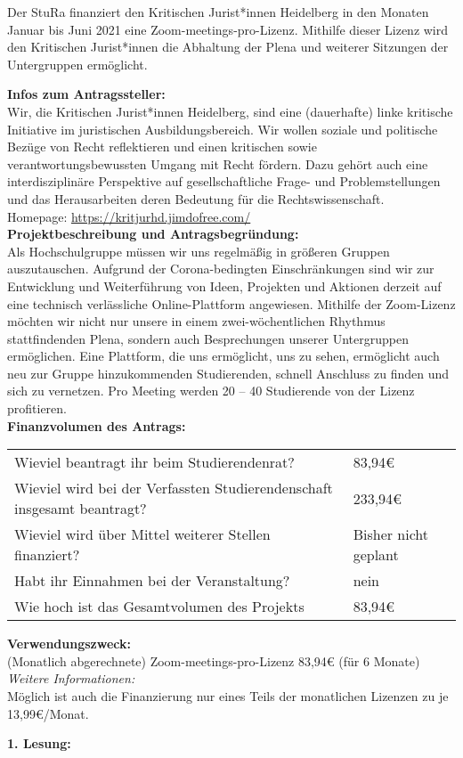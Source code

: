 {
    Der StuRa finanziert den Kritischen Jurist*innen Heidelberg in den Monaten Januar bis Juni 2021 eine Zoom-meetings-pro-Lizenz. Mithilfe dieser Lizenz wird den Kritischen Jurist*innen die Abhaltung der Plena und weiterer Sitzungen der Untergruppen ermöglicht.
}{
    \textbf{Infos zum Antragssteller:}\\
    Wir, die Kritischen Jurist*innen Heidelberg, sind eine (dauerhafte) linke kritische Initiative im juristischen Ausbildungsbereich. Wir wollen soziale und politische Bezüge von Recht reflektieren und einen kritischen sowie verantwortungsbewussten Umgang mit Recht fördern. Dazu gehört auch eine interdisziplinäre Perspektive auf gesellschaftliche Frage- und Problemstellungen und das Herausarbeiten deren Bedeutung für die Rechtswissenschaft.\\
    Homepage: \url{https://kritjurhd.jimdofree.com/}\\[1em]
    \textbf{Projektbeschreibung und Antragsbegründung:}\\
    Als Hochschulgruppe müssen wir uns regelmäßig in größeren Gruppen auszutauschen. Aufgrund der Corona-bedingten Einschränkungen sind wir zur Entwicklung und Weiterführung von Ideen, Projekten und Aktionen derzeit auf eine technisch verlässliche Online-Plattform angewiesen. Mithilfe der Zoom-Lizenz möchten wir nicht nur unsere in einem zwei-wöchentlichen Rhythmus stattfindenden Plena, sondern auch Besprechungen unserer Untergruppen ermöglichen. Eine Plattform, die uns ermöglicht, uns zu sehen, ermöglicht auch neu zur Gruppe hinzukommenden Studierenden, schnell Anschluss zu finden und sich zu vernetzen. Pro Meeting werden 20 – 40 Studierende von der Lizenz profitieren.\\[1em]
    \textbf{Finanzvolumen des Antrags:}\\
    \begin{tabular}{l l}
        Wieviel beantragt ihr beim Studierendenrat?                             & 83,94€       \\
        Wieviel wird bei der Verfassten Studierendenschaft insgesamt beantragt? & 233,94€    \\
        Wieviel wird über Mittel weiterer Stellen finanziert?                   & Bisher nicht geplant      \\
        Habt ihr Einnahmen bei der Veranstaltung?                               & nein \\
        Wie hoch ist das Gesamtvolumen des Projekts                             & 83,94€\\
    \end{tabular}
    \newline
    \textbf{Verwendungszweck:}\\
    (Monatlich abgerechnete) Zoom-meetings-pro-Lizenz 83,94€ (für 6 Monate)
    \emph{Weitere Informationen:}\\
    Möglich ist auch die Finanzierung nur eines Teils der monatlichen Lizenzen zu je 13,99€/Monat.
}{
    \textbf{1. Lesung:}
    \ul{
    }
}
